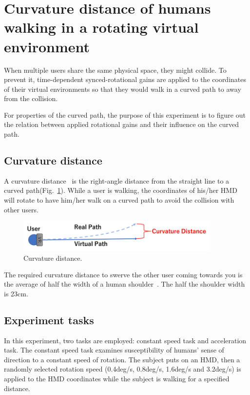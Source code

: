 \newpage
\section{Curvature distance of humans walking in a rotating virtual environment}
When multiple users share the same physical space, they might collide. To prevent it, time-dependent synced-rotational gains are applied to the coordinates of their virtual environments so that they would walk in a curved path to away from the collision.

For properties of the curved path, the purpose of this experiment is to figure out the relation between applied rotational gains and their influence on the curved path.

\subsection{Curvature distance}
A curvature distance~\cite{6200791} is the right-angle distance from the straight line to a curved path(Fig.~\ref{fig:CurevDistance}). While a user is walking, the coordinates of his/her HMD will rotate to have him/her walk on a curved path to avoid the collision with other users.
\begin{figure}[H]\centering
	\includegraphics[width=0.9\textwidth]{Pictures/Curvature distance.png}%
	\caption{Curvature distance.}\label{fig:CurevDistance}%
\end{figure}

The required curvature distance to swerve the other user coming towards you is the average of half the width of a human shoulder~\cite{9660069}. The half the shoulder width is 23cm.

\newpage
\subsection{Experiment tasks}
In this experiment, two tasks are employed: constant speed task and acceleration task. The constant speed task examines susceptibility of humans' sense of direction to a constant speed of rotation.
The subject puts on an HMD, then a randomly selected rotation speed (0.4deg/s, 0.8deg/s, 1.6deg/s and 3.2deg/s) is applied to the HMD coordinates while the subject is walking for a specified distance. 

